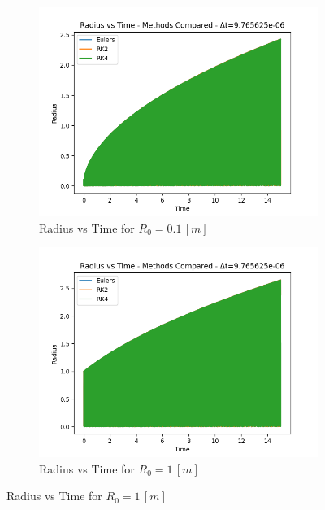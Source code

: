 \documentclass[12pt]{article}
\begin{document}
\begin{figure}[H]
    \centering
    \begin{subfigure}[h]{0.495\textwidth}
        \includegraphics[width=\textwidth]{out/size_variance/Question_2/0.1/dt_9.765625e-06/combined_graph.png}
        \caption{Radius vs Time for $R_0 = 0.1\, [m]$}
        \label{fig:radius_0.1}
    \end{subfigure}
    \hfill
    \begin{subfigure}[h]{0.495\textwidth}
        \includegraphics[width=\textwidth]{out/size_variance/Question_2/1/dt_9.765625e-06/combined_graph.png}
        \caption{Radius vs Time for $R_0 = 1\, [m]$}
        \label{fig:radius_1}
    \end{subfigure}

\end{figure}
\end{document}
